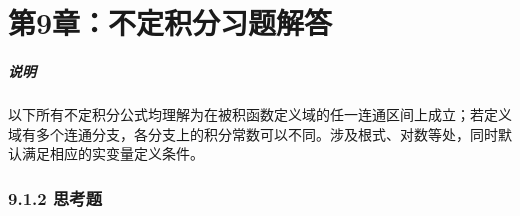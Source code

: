 
\chapter*{第9章：不定积分习题解答}
\paragraph{说明}
以下所有不定积分公式均理解为在被积函数定义域的任一连通区间上成立；若定义域有多个连通分支，各分支上的积分常数可以不同。涉及根式、对数等处，同时默认满足相应的实变量定义条件。

\subsection*{9.1.2 思考题}

